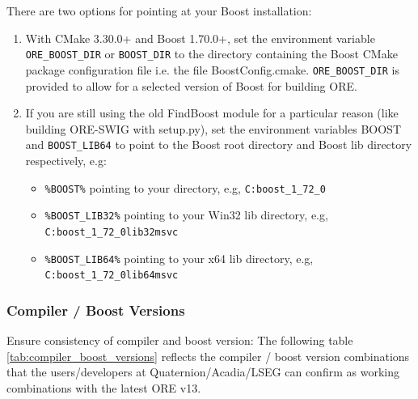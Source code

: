 There are two options for pointing at your Boost installation:
\begin{enumerate}
\item With CMake 3.30.0+ and Boost 1.70.0+, set the environment variable {\tt ORE\_BOOST\_DIR} or {\tt BOOST\_DIR} to the directory containing the 
Boost CMake package configuration file i.e. the file BoostConfig.cmake. {\tt ORE\_BOOST\_DIR} is provided to allow for a selected version of
Boost for building ORE.
\item If you are still using the old FindBoost module for a particular reason (like building ORE-SWIG with setup.py), set the 
environment variables BOOST and {\tt BOOST\_LIB64} to point to the Boost root directory and Boost lib directory respectively, e.g:
    \begin{itemize}
        \item {\tt \%BOOST\%} pointing to your directory, e.g, {\tt C:{\bs}boost\_1\_72\_0}
        \item {\tt \%BOOST\_LIB32\%} pointing to your Win32 lib directory, e.g, {\tt C:{\bs}boost\_1\_72\_0{\bs}lib32\-msvc}
        \item {\tt \%BOOST\_LIB64\%} pointing to your x64 lib directory, e.g, {\tt C:{\bs}boost\_1\_72\_0{\bs}lib64\-msvc}
    \end{itemize}
\end{enumerate}


\subsubsection*{Compiler / Boost Versions}
\label{sec:compiler_boost_versions}

Ensure consistency of compiler and boost version: The following table \ref{tab:compiler_boost_versions} reflects the compiler / boost
version combinations that the users/developers at Quaternion/Acadia/LSEG can confirm as working combinations with the latest ORE v13.

